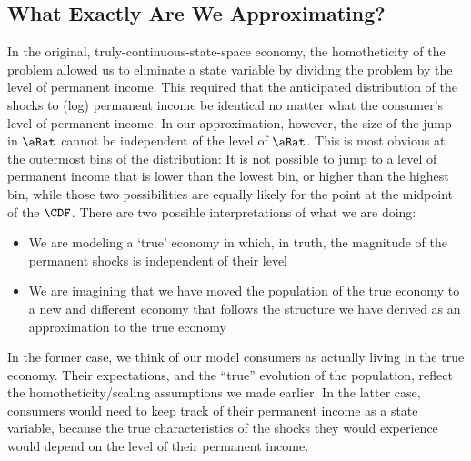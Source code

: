 \documentclass[\econtexRoot/BufferStockTheory.tex]{subfiles}
\begin{document}
\subsection{What Exactly Are We Approximating?}
In the original, truly-continuous-state-space economy, the homotheticity of the problem allowed us to eliminate a state variable by dividing the problem by the level of permanent income.  This required that the anticipated distribution of the shocks to (log) permanent income be identical no matter what the consumer's level of permanent income.
In our approximation, however, the size of the jump in $\pnt$ cannot be independent of the level of $\pnt$.  This is most obvious at the outermost bins of the distribution: It is not possible to jump to a level of permanent income that is lower than the lowest bin, or higher than the highest bin, while those two possibilities are equally likely for the point at the midpoint of the $\CDF$.  
There are two possible interpretations of what we are doing:
\begin{itemize}
\item We are modeling a `true' economy in which, in truth, the magnitude of the permanent shocks is independent of their level
\item We are imagining that we have moved the population of the true economy to a new and different economy that follows the structure we have derived as an approximation to the true economy
\end{itemize}
In the former case, we think of our model consumers as actually living in the true economy.  Their expectations, and the ``true'' evolution of the population, reflect the homotheticity/scaling assumptions we made earlier.  In the latter case, consumers would need to keep track of their permanent income as a state variable, because the true characteristics of the shocks they would experience would depend on the level of their permanent income.
\pagebreak
{}
\end{document}
